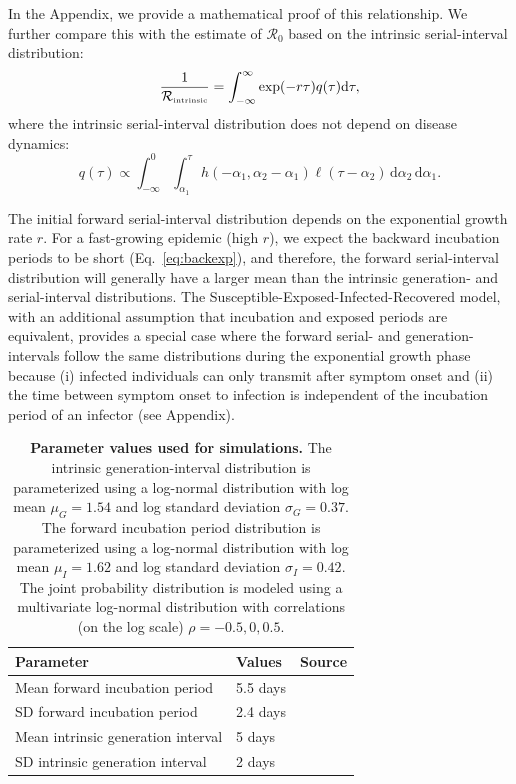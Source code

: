 \documentclass[12pt]{article}
\newcommand{\eref}[1]{Eq.~\ref{eq:#1}}
\newcommand{\Rx}[1]{\ensuremath{{\mathcal R}_{#1}}\xspace}
\newcommand{\Ro}{\Rx{0}}
\newcommand{\Rintrinsic}{\ensuremath{{\mathcal R}_{\textrm{\tiny intrinsic}}}\xspace}
\newcommand{\pinf}{\ensuremath{\alpha_1}} %
\newcommand{\sinf}{\ensuremath{\alpha_2}} %
\newcommand{\idist}{\ell} %
\begin{document}
In the Appendix, we provide a mathematical proof of this relationship.
We further compare this with the estimate of \Ro based on the intrinsic serial-interval distribution:
\begin{equation}
\frac{1}{\Rintrinsic} = \int_{-\infty}^\infty \exp(-r\tau) q(\tau) \mathrm{d} \tau,
\end{equation}
where the intrinsic serial-interval distribution does not depend on disease dynamics:
\begin{equation}
q(\tau) \propto \int_{-\infty}^{0} \int_{\pinf}^{\tau} h(-\pinf, \sinf - \pinf) \idist(\tau - \sinf) \, \mathrm{d}\sinf\,\mathrm{d}\pinf.
\end{equation}

The initial forward serial-interval distribution depends on the exponential growth rate $r$.
For a fast-growing epidemic (high $r$), we expect the backward incubation periods to be short (\eref{backexp}), and therefore, the forward serial-interval distribution will generally have a larger mean than the intrinsic generation- and serial-interval distributions.
The Susceptible-Exposed-Infected-Recovered model, with an additional assumption that incubation and exposed periods are equivalent, provides a special case where the forward serial- and generation-intervals follow the same distributions during the exponential growth phase because (i) infected individuals can only transmit after symptom onset and (ii) the time between symptom onset to infection is independent of the incubation period of an infector (see Appendix).

\begin{table}[!th]
\begin{center}
\begin{tabular}{|l|l|r|}
\hline
Parameter & Values & Source\\
\hline
Mean forward incubation period & 5.5 days & \cite{lauer2020incubation} \\
SD forward incubation period & 2.4 days & \cite{lauer2020incubation} \\
Mean intrinsic generation interval & 5 days & \cite{ferretti2020quantifying} \\
SD intrinsic generation interval & 2 days & \cite{ferretti2020quantifying} \\
\hline
\end{tabular}
\end{center}
\caption{
\textbf{Parameter values used for simulations.}
The intrinsic generation-interval distribution is parameterized using a log-normal distribution with log mean $\mu_G=1.54$ and log standard deviation $\sigma_G=0.37$.
The forward incubation period distribution is parameterized using a log-normal distribution with log mean $\mu_I=1.62$ and log standard deviation $\sigma_I=0.42$.
The joint probability distribution is modeled using a multivariate log-normal distribution with correlations (on the log scale) $\rho=-0.5, 0, 0.5$.
}
\end{table}
\end{document}
